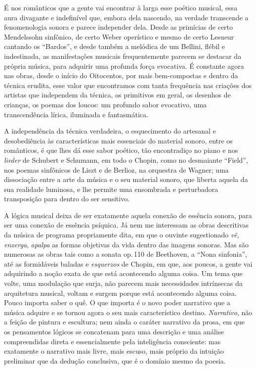É nos românticos que a gente vai encontrar à larga esse poético musical,
essa aura divagante e indefinível que, embora dela nascendo, na verdade
transcende a fenomenologia sonora e parece independer dela. Desde as
primícias de certo Mendelssohn sinfônico, de certo Weber operístico e
mesmo de certo Lesueur cantando os ``Bardos'', e desde também a melódica
de um Bellini, flébil e indestinada, as manifestações musicais
frequentemente parecem se destacar da própria música, para adquirir uma
profunda força evocativa. É constante agora nas obras, desde o início do
Oitocentos, por mais bem-compostas e dentro da técnica erudita, esse
valor que encontramos com tanta frequência nas criações dos artistas que
independem da técnica, os primitivos em geral, os desenhos de crianças,
os poemas dos loucos: um profundo sabor evocativo, uma transcendência
lírica, iluminada e fantasmática.

A independência da técnica verdadeira, o esquecimento do artesanal e
desobediência às características mais essenciais do material sonoro,
entre os românticos, é que lhes dá esse sabor poético, tão encontradiço
no piano e nos \textit{lieder} de Schubert e Schumann, em todo o Chopin, como no
desmaiante ``Field'', nos poemas sinfônicos de Liszt e de Berlioz, na
orquestra de Wagner; uma dissociação entre a arte da música e o seu
material sonoro, que liberta aquela da sua realidade luminosa, e lhe
permite uma ensombrada e perturbadora transposição para dentro do ser
sensitivo.

A lógica musical deixa de ser exatamente aquela conexão de essência
sonora, para ser uma conexão de essência psíquica. Já nem me interessam
as obras descritivas da música de programa propriamente dita, em que o
ouvinte sugestionado \textit{vê}, \textit{enxerga}, \textit{apalpa} as formas objetivas
da vida dentro das imagens sonoras. Mas são numerosas as obras tais como
a sonata op.\,110 de Beethoven, a ``Nona sinfonia'', até as formidáveis
baladas e \textit{esquerzos} de Chopin, em que, aos poucos, a gente vai
adquirindo a noção exata de que está acontecendo alguma coisa. Um tema
que volte, uma modulação que surja, não parecem mais necessidades
intrínsecas da arquitetura musical, voltam e surgem porque está
acontecendo alguma coisa. Pouco importa saber o quê. O que importa é o
novo poder narrativo que a música adquire e se tornou agora o seu mais
característico destino. \textit{Narrativo}, não a feição de pintura e
escultura; nem ainda o caráter narrativo da prosa, em que os pensamentos
lógicos se concatenam para uma descrição e uma análise compreendidas
direta e essencialmente pela inteligência consciente: mas exatamente o
narrativo mais livre, mais escuso, mais próprio da intuição preliminar
que da dedução conclusiva, que é o domínio mesmo da poesia.

